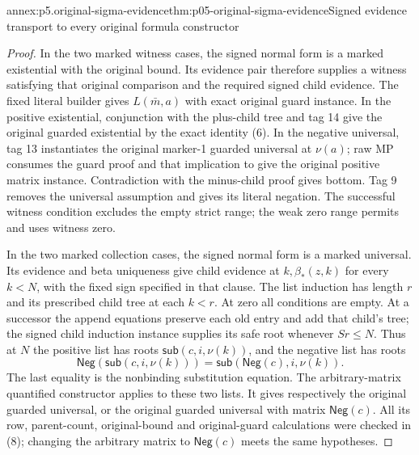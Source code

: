 \begin{annexitem}{annex:p5.original-sigma-evidence}{thm:p05-original-sigma-evidence}{Signed evidence transport to every original formula constructor}
\begin{proof}
In the two marked witness cases, the signed normal form is a
marked existential with the original bound. Its evidence pair
therefore supplies a witness satisfying that original comparison
and the required signed child evidence. The fixed literal
builder gives \(L(\bar m,a)\) with exact original guard
instance. In the positive existential, conjunction with the
plus-child tree and tag 14 give the original guarded existential
by the exact identity (6). In the negative universal, tag 13
instantiates the original marker-1 guarded universal at
\(\nu(a)\); raw MP consumes the guard proof and that
implication to give the original positive matrix instance.
Contradiction with the minus-child proof gives bottom. Tag 9
removes the universal assumption and gives its literal negation.
The successful witness condition excludes the empty strict range;
the weak zero range permits and uses witness zero.

In the two marked collection cases, the signed normal form is a
marked universal. Its evidence and beta uniqueness give child
evidence at \(k,\beta_*(z,k)\) for every \(k<N\), with the
fixed sign specified in that clause. The list induction has
length \(r\) and its prescribed child tree at each \(k<r\).
At zero all conditions are empty. At a successor the append
equations preserve each old entry and add that child's tree;
the signed child induction instance supplies its safe root
whenever \(Sr\leq N\). Thus at \(N\) the positive list has
roots \(\mathsf{sub}(c,i,\nu(k))\), and the negative list
has roots
\[
 \mathsf{Neg}(\mathsf{sub}(c,i,\nu(k)))
                    =\mathsf{sub}(\mathsf{Neg}(c),i,\nu(k)).
\tag{S4}
\]
The last equality is the nonbinding substitution equation.
The arbitrary-matrix quantified constructor applies to these
two lists. It gives respectively the original guarded universal,
or the original guarded universal with matrix \(\mathsf{Neg}(c)\).
All its row, parent-count, original-bound and original-guard
calculations were checked in (8); changing the arbitrary matrix
to \(\mathsf{Neg}(c)\) meets the same hypotheses.


\end{proof}
\end{annexitem}
